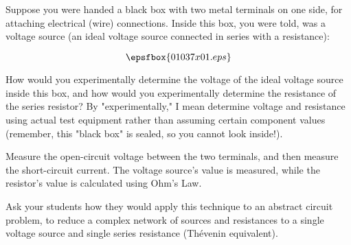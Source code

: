

Suppose you were handed a black box with two metal terminals on one side, for attaching electrical (wire) connections.  Inside this box, you were told, was a voltage source (an ideal voltage source connected in series with a resistance):

$$\epsfbox{01037x01.eps}$$

How would you experimentally determine the voltage of the ideal voltage source inside this box, and how would you experimentally determine the resistance of the series resistor?  By "experimentally," I mean determine voltage and resistance using actual test equipment rather than assuming certain component values (remember, this "black box" is sealed, so you cannot look inside!).







Measure the open-circuit voltage between the two terminals, and then measure the short-circuit current.  The voltage source's value is measured, while the resistor's value is calculated using Ohm's Law.







Ask your students how they would apply this technique to an abstract circuit problem, to reduce a complex network of sources and resistances to a single voltage source and single series resistance (Th\'evenin equivalent).




